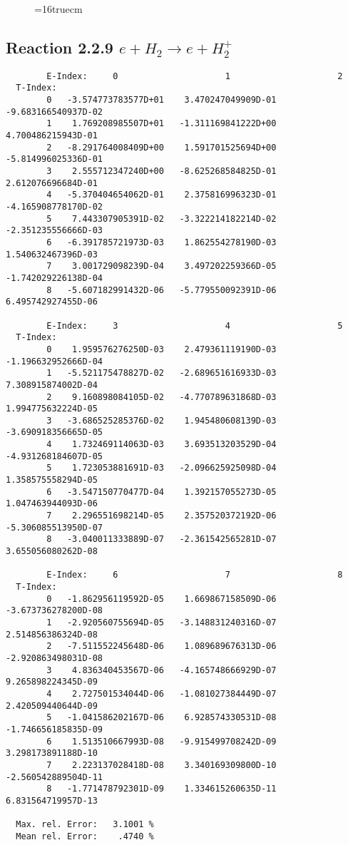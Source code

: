 \documentclass[12pt]{article}
\begin{document}
\begin{figure} \label{2.2.5g}
\epsfxsize=16truecm
\end{figure}
\newpage


\subsection{
Reaction 2.2.9  $  e + H_2       \rightarrow e + H_2^+  $
}



\begin{small}\begin{verbatim}
        E-Index:     0                     1                     2
  T-Index:
        0   -3.574773783577D+01    3.470247049909D-01   -9.683166540937D-02
        1    1.769208985507D+01   -1.311169841222D+00    4.700486215943D-01
        2   -8.291764008409D+00    1.591701525694D+00   -5.814996025336D-01
        3    2.555712347240D+00   -8.625268584825D-01    2.612076696684D-01
        4   -5.370404654062D-01    2.375816996323D-01   -4.165908778170D-02
        5    7.443307905391D-02   -3.322214182214D-02   -2.351235556666D-03
        6   -6.391785721973D-03    1.862554278190D-03    1.540632467396D-03
        7    3.001729098239D-04    3.497202259366D-05   -1.742029226138D-04
        8   -5.607182991432D-06   -5.779550092391D-06    6.495742927455D-06

        E-Index:     3                     4                     5
  T-Index:
        0    1.959576276250D-03    2.479361119190D-03   -1.196632952666D-04
        1   -5.521175478827D-02   -2.689651616933D-03    7.308915874002D-04
        2    9.160898084105D-02   -4.770789631868D-03    1.994775632224D-05
        3   -3.686525285376D-02    1.945480608139D-03   -3.690918356665D-05
        4    1.732469114063D-03    3.693513203529D-04   -4.931268184607D-05
        5    1.723053881691D-03   -2.096625925098D-04    1.358575558294D-05
        6   -3.547150770477D-04    1.392157055273D-05    1.047463944093D-06
        7    2.296551698214D-05    2.357520372192D-06   -5.306085513950D-07
        8   -3.040011333889D-07   -2.361542565281D-07    3.655056080262D-08

        E-Index:     6                     7                     8
  T-Index:
        0   -1.862956119592D-05    1.669867158509D-06   -3.673736278200D-08
        1   -2.920560755694D-05   -3.148831240316D-07    2.514856386324D-08
        2   -7.511552245648D-06    1.089689676313D-06   -2.920863498031D-08
        3    4.836340453567D-06   -4.165748666929D-07    9.265898224345D-09
        4    2.727501534044D-06   -1.081027384449D-07    2.420509440644D-09
        5   -1.041586202167D-06    6.928574330531D-08   -1.746656185835D-09
        6    1.513510667993D-08   -9.915499708242D-09    3.298173891188D-10
        7    2.223137028418D-08    3.340169309800D-10   -2.560542889504D-11
        8   -1.771478792301D-09    1.334615260635D-11    6.831564719957D-13

  Max. rel. Error:   3.1001 %
  Mean rel. Error:    .4740 %

\end{verbatim}\end{small}
\end{document}
